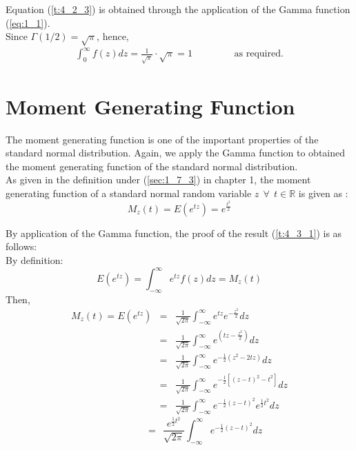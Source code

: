 \documentclass[11pt]{report}
\newcommand{\sps}{\\[0.2cm]}
\newcommand{\refn}[1]{(\ref{#1})}
\newcommand{\refx}[1]{\refn{eq:#1}}
\newcommand{\dsp}{\displaystyle}
\newcommand{\NI}{\noindent}
\newcommand{\real}{ \mathbb{R}}
\begin{document}
	\NI Equation \refn{t:4_2_3} is obtained through the application of the Gamma function \refx{1_1}.\sps
	
	\NI Since $\dsp\Gamma(1/2) = \sqrt{\pi}$, hence,
	\begin{eqnarray*}
		\int_0^\infty f(z)dz = \frac{1}{\sqrt{\pi}} \cdot \sqrt{\pi} = 1 \qquad\qquad\text{ as required.}
	\end{eqnarray*}
	

	\section{Moment Generating Function}
	The moment generating function is one of the important properties of the standard normal distribution. Again, we apply the Gamma function to obtained the moment generating function of the standard normal distribution.\\
	
	As given in the definition under \refn{sec:1_7_3} in chapter 1, the moment generating function of a standard normal random variable $z~~\forall~~ t\in \real$ is given as :
	\begin{equation}
		M_z(t) = E\left(e^{tz}\right) = e^{\frac{t^2}{2}}\tag{1}\label{t:4_3_1}
	\end{equation}

	\NI By application of the Gamma function, the proof of the result \refn{t:4_3_1} is as follows:\sps
	
	\NI By definition:\\
	\begin{equation}
		E\left(e^{tz}\right) = \int_{-\infty}^{\infty}e^{tz}f(z)dz = M_z(t)\tag{2}\label{t:4_3_2}
	\end{equation}
	Then,
	\begin{eqnarray*}
		M_z(t) = E\left(e^{tz}\right) &=& \frac{1}{\sqrt{2\pi}}\int_{-\infty}^{\infty}e^{tz}e^{-\frac{z^2}{2}}dz\sps
		&=& \frac{1}{\sqrt{2\pi}}\int_{-\infty}^{\infty}e^{(tz-\frac{z^2}{2})}dz\sps
		&=&\frac{1}{\sqrt{2\pi}}\int_{-\infty}^\infty e^{-\frac{1}{2}(z^2 - 2tz)}dz\sps
		&=&\frac{1}{\sqrt{2\pi}}\int_{-\infty}^\infty e^{-\frac{1}{2}\left[(z-t)^2 - t^2\right]}dz\sps
		&=&\frac{1}{\sqrt{2\pi}}\int_{-\infty}^\infty e^{-\frac{1}{2}(z-t)^2} e^{\frac{1}{2}t^2}dz
	\end{eqnarray*}
	\begin{equation}
		{~\qquad\qquad~~~~}=~~ \frac{e^{\frac{1}{2}t^2}}{\sqrt{2\pi}}\int_{-\infty}^\infty e^{-\frac{1}{2}(z-t)^2} dz\tag{3}\label{t:4_3_3}
	\end{equation}
\end{document}
